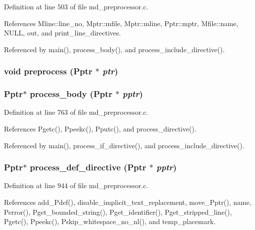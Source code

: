 Definition at line 503 of file md\_\-preprocessor.c.

References Mline::line\_\-no, Mptr::mfile, Mptr::mline, Pptr::mptr, Mfile::name, NULL, out, and print\_\-line\_\-directives.

Referenced by main(), process\_\-body(), and process\_\-include\_\-directive().
\subsubsection{\setlength{\rightskip}{0pt plus 5cm}void preprocess (\bf{Pptr} $\ast$ {\em ptr})}\label{md__preprocessor_8h_4ade4a7448fe7143090e668582be2e54}


\subsubsection{\setlength{\rightskip}{0pt plus 5cm}\bf{Pptr}$\ast$ process\_\-body (\bf{Pptr} $\ast$ {\em pptr})}\label{md__preprocessor_8h_3c40c88a57af572f6e543e31a4b55768}




Definition at line 763 of file md\_\-preprocessor.c.

References Pgetc(), Ppeekc(), Pputc(), and process\_\-directive().

Referenced by main(), process\_\-if\_\-directive(), and process\_\-include\_\-directive().
\subsubsection{\setlength{\rightskip}{0pt plus 5cm}\bf{Pptr}$\ast$ process\_\-def\_\-directive (\bf{Pptr} $\ast$ {\em pptr})}\label{md__preprocessor_8h_fdaaf0c08b62cd43e5837509c73874ce}




Definition at line 944 of file md\_\-preprocessor.c.

References add\_\-Pdef(), disable\_\-implicit\_\-text\_\-replacement, move\_\-Pptr(), name, Perror(), Pget\_\-bounded\_\-string(), Pget\_\-identifier(), Pget\_\-stripped\_\-line(), Pgetc(), Ppeekc(), Pskip\_\-whitespace\_\-no\_\-nl(), and temp\_\-placemark.

